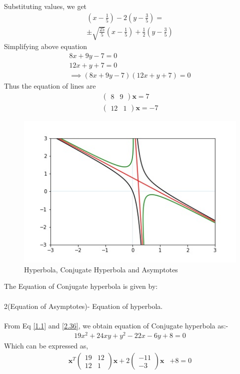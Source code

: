 \documentclass[journal,12pt,twocolumn]{IEEEtran}
\let\vec\mathbf
\numberwithin{equation}{subsection}
\newcommand{\myvec}[1]{\ensuremath{\begin{pmatrix}#1\end{pmatrix}}}
\begin{document}
Substituting values, we get 
\begin{multline}
	(x-\frac{1}{5})-2(y-\frac{3}{5}) = \\ \pm \sqrt{\frac{25}{5}}(x-\frac{1}{5})+\frac{1}{2}(y-\frac{3}{5}) 
\end{multline}
Simplifying above equation
\begin{align}
	8x+ 9y - 7 = 0 \\
	12x + y + 7 = 0\\
	\implies (8x+ 9y - 7 )(12x + y + 7) = 0
\end{align}
Thus the equation of lines are
\begin{align}
	\myvec{8 & 9}\vec{x} = 7 \\
	\myvec{12 & 1}\vec{x} = -7 
\end{align}
\begin{figure}[h]
    \centering
    \includegraphics[width=\columnwidth]{hyperbola.jpg}
    \caption{Hyperbola, Conjugate Hyperbola and Asymptotes}
    \label{Fig :1}
\end{figure}
 The Equation of Conjugate hyperbola is given by:\\
\\
2(Equation of Asymptotes)- Equation of hyperbola.\\
\\
From Eq \ref{1.1} and \ref{2.36}, we obtain equation of Conjugate hyperbola as:-
\begin{align}
19x^2 + 24xy+y^2-22x-6y+8=0 
\end{align}
Which can be expressed as, 
\begin{align}
\vec{x}^T\myvec{19 & 12 \\12 & 1}\vec{x} +2\myvec{-11 \\-3} \vec{x}&+8= 0 \label{2.66}
\end{align}
\end{document}
